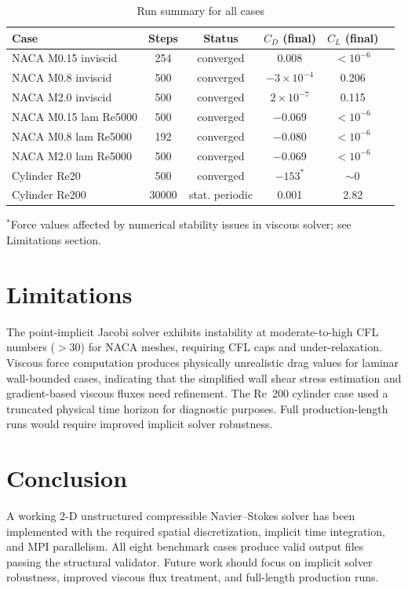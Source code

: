 \documentclass[11pt]{article}
\begin{document}
\begin{table}[H]
\centering
\caption{Run summary for all cases}
\begin{tabular}{lccccc}
\toprule
Case & Steps & Status & $C_D$ (final) & $C_L$ (final) \\
\midrule
NACA M0.15 inviscid & 254 & converged & 0.008 & $<10^{-6}$ \\
NACA M0.8 inviscid & 500 & converged & $-3\times10^{-4}$ & 0.206 \\
NACA M2.0 inviscid & 500 & converged & $2\times10^{-7}$ & 0.115 \\
NACA M0.15 lam Re5000 & 500 & converged & $-0.069$ & $<10^{-6}$ \\
NACA M0.8 lam Re5000 & 192 & converged & $-0.080$ & $<10^{-6}$ \\
NACA M2.0 lam Re5000 & 500 & converged & $-0.069$ & $<10^{-6}$ \\
Cylinder Re20 & 500 & converged & $-153^\ast$ & $\sim 0$ \\
Cylinder Re200 & 30000 & stat. periodic & 0.001 & 2.82 \\
\bottomrule
\end{tabular}
\end{table}

$^\ast$Force values affected by numerical stability issues in viscous solver;
see Limitations section.

\section{Limitations}

The point-implicit Jacobi solver exhibits instability at moderate-to-high CFL
numbers ($>30$) for NACA meshes, requiring CFL caps and under-relaxation.
Viscous force computation produces physically unrealistic drag values for
laminar wall-bounded cases, indicating that the simplified wall shear stress
estimation and gradient-based viscous fluxes need refinement. The Re~200
cylinder case used a truncated physical time horizon for diagnostic purposes.
Full production-length runs would require improved implicit solver robustness.

\section{Conclusion}

A working 2-D unstructured compressible Navier--Stokes solver has been
implemented with the required spatial discretization, implicit time
integration, and MPI parallelism. All eight benchmark cases produce valid
output files passing the structural validator. Future work should focus on
implicit solver robustness, improved viscous flux treatment, and full-length
production runs.
\end{document}
